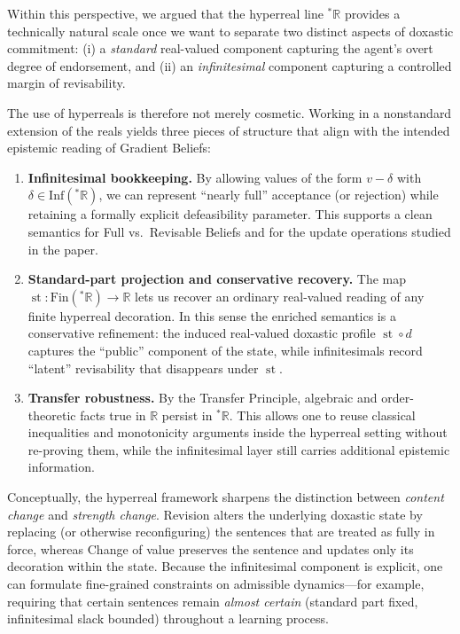 \documentclass[12pt,a4paper,reqno]{amsart}
\theoremstyle{definition}
\DeclareMathOperator{\st}{st}
\newcommand{\Fin}{\mathrm{Fin}}
\newcommand{\Inf}{\mathrm{Inf}}
\begin{document}
\medskip
\noindent
Within this perspective, we argued that the hyperreal line ${}^{\ast}\mathbb{R}$ provides a technically
natural scale once we want to separate two distinct aspects of doxastic commitment:
(i) a \emph{standard} real-valued component capturing the agent's overt degree of endorsement, and
(ii) an \emph{infinitesimal} component capturing a controlled margin of revisability.

\medskip
\noindent
The use of hyperreals is therefore not merely cosmetic.
Working in a nonstandard extension of the reals yields three pieces of structure that align with the
intended epistemic reading of Gradient Beliefs:

\begin{enumerate}
  \item \textbf{Infinitesimal bookkeeping.}
  By allowing values of the form $v-\delta$ with $\delta\in\Inf({}^{\ast}\mathbb{R})$,
  we can represent ``nearly full'' acceptance (or rejection) while retaining a formally explicit
  defeasibility parameter. This supports a clean semantics for Full vs.\ Revisable Beliefs and for the
  update operations studied in the paper.
  \item \textbf{Standard-part projection and conservative recovery.}
  The map $\st:\Fin({}^{\ast}\mathbb{R})\to\mathbb{R}$ lets us recover an ordinary real-valued reading of
  any finite hyperreal decoration. In this sense the enriched semantics is a conservative refinement:
  the induced real-valued doxastic profile $\st\!\circ d$ captures the ``public'' component of the
  state, while infinitesimals record ``latent'' revisability that disappears under $\st$.
  \item \textbf{Transfer robustness.}
  By the Transfer Principle, algebraic and order-theoretic facts true in $\mathbb{R}$ persist in
  ${}^{\ast}\mathbb{R}$. This allows one to reuse classical inequalities and monotonicity arguments
  inside the hyperreal setting without re-proving them, while the infinitesimal layer still carries
  additional epistemic information.
\end{enumerate}

\medskip
\noindent
Conceptually, the hyperreal framework sharpens the distinction between \emph{content change} and
\emph{strength change}. Revision alters the underlying doxastic state by replacing (or otherwise
reconfiguring) the sentences that are treated as fully in force, whereas Change of value preserves the
sentence and updates only its decoration within the state. Because the infinitesimal component is explicit,
one can formulate fine-grained constraints on admissible dynamics---for example, requiring that certain
sentences remain \emph{almost certain} (standard part fixed, infinitesimal slack bounded) throughout a
learning process.
\end{document}
